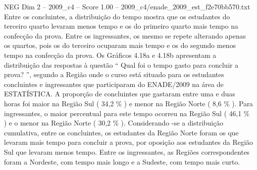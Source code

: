 \begin{textsample}{NEG Dim 2 – 2009\_c4 – Score 1.00 – 2009\_c4/enade\_2009\_est\_f2e70bb570.txt}
Entre os concluintes, a distribuição do tempo mostra que os estudantes do terceiro quarto levaram menos tempo e os do primeiro quarto mais tempo na confecção da prova.
Entre os ingressantes, os mesmo se repete alterando apenas os quartos, pois os do terceiro ocuparam mais tempo e os do segundo menos tempo na confecção da prova.
Os Gráficos 4.18a e 4.18b apresentam a distribuição das respostas à questão “ Qual foi o tempo gasto para concluir a prova? ”, segundo a Região onde o curso está situado para os estudantes concluintes e ingressantes que participaram do ENADE/2009 na área de ESTATÍSTICA.
A proporção de concluintes que gastaram entre uma e duas horas foi maior na Região Sul ( 34,2 \% ) e menor na Região Norte ( 8,6 \% ).
Para ingressantes, o maior percentual para este tempo ocorreu na Região Sul ( 46,1 \% ) e o menor na Região Norte ( 30,2 \% ).
Considerando -se a distribuição cumulativa, entre os concluintes, os estudantes da Região Norte foram os que levaram mais tempo para concluir a prova, por oposição aos estudantes da Região Sul que levaram menos tempo.
Entre os ingressantes, as Regiões correspondentes foram a Nordeste, com tempo mais longo e a Sudeste, com tempo mais curto.

\end{textsample}
